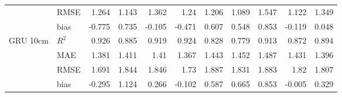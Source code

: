\begin{tabular}{llrrrrrrrrr}
                                     & RMSE  &  1.264 & 1.143 &  1.362 &  1.24  & 1.206 &  1.089 & 1.547 &  1.122 &     1.349 \\
                                     & bias  & -0.775 & 0.735 & -0.105 & -0.471 & 0.607 &  0.548 & 0.853 & -0.119 &     0.048 \\
 GRU 10cm                            & $R^2$ &  0.926 & 0.885 &  0.919 &  0.924 & 0.828 &  0.779 & 0.913 &  0.872 &     0.894 \\
                                     & MAE   &  1.381 & 1.411 &  1.41  &  1.367 & 1.443 &  1.452 & 1.487 &  1.431 &     1.396 \\
                                     & RMSE  &  1.691 & 1.844 &  1.846 &  1.73  & 1.887 &  1.831 & 1.883 &  1.82  &     1.807 \\
                                     & bias  & -0.295 & 1.124 &  0.266 & -0.102 & 0.587 &  0.665 & 0.853 & -0.005 &     0.329 \\
\hline
\end{tabular}